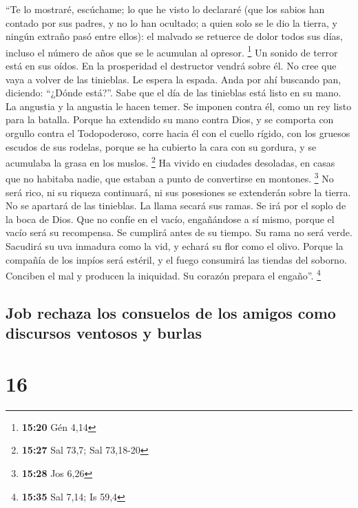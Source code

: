  ``Te lo mostraré, escúchame; lo que he visto lo
declararé  (que los sabios han contado por sus padres, y
no lo han ocultado;  a quien solo se le dio la tierra, y
ningún extraño pasó entre ellos):  el malvado se retuerce
de dolor todos sus días, incluso el número de años que se le acumulan al
opresor. \footnote{\textbf{15:20} Gén 4,14}  Un sonido de
terror está en sus oídos. En la prosperidad el destructor vendrá sobre
él.  No cree que vaya a volver de las tinieblas. Le
espera la espada.  Anda por ahí buscando pan, diciendo:
``¿Dónde está?''. Sabe que el día de las tinieblas está listo en su
mano.  La angustia y la angustia le hacen temer. Se
imponen contra él, como un rey listo para la batalla. 
Porque ha extendido su mano contra Dios, y se comporta con orgullo
contra el Todopoderoso,  corre hacia él con el cuello
rígido, con los gruesos escudos de sus rodelas,  porque
se ha cubierto la cara con su gordura, y se acumulaba la grasa en los
muslos. \footnote{\textbf{15:27} Sal 73,7; Sal 73,18-20} 
Ha vivido en ciudades desoladas, en casas que no habitaba nadie, que
estaban a punto de convertirse en montones. \footnote{\textbf{15:28} Jos
  6,26}  No será rico, ni su riqueza continuará, ni sus
posesiones se extenderán sobre la tierra.  No se apartará
de las tinieblas. La llama secará sus ramas. Se irá por el soplo de la
boca de Dios.  Que no confíe en el vacío, engañándose a
sí mismo, porque el vacío será su recompensa.  Se
cumplirá antes de su tiempo. Su rama no será verde. 
Sacudirá su uva inmadura como la vid, y echará su flor como el olivo.
 Porque la compañía de los impíos será estéril, y el
fuego consumirá las tiendas del soborno.  Conciben el mal
y producen la iniquidad. Su corazón prepara el engaño''. \footnote{\textbf{15:35}
  Sal 7,14; Is 59,4}

\hypertarget{job-rechaza-los-consuelos-de-los-amigos-como-discursos-ventosos-y-burlas}{%
\subsection{Job rechaza los consuelos de los amigos como discursos
ventosos y
burlas}\label{job-rechaza-los-consuelos-de-los-amigos-como-discursos-ventosos-y-burlas}}

\hypertarget{section-15}{%
\section{16}\label{section-15}}

